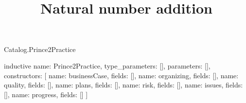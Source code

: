 \begin{lexlean}{Catalog.Prince2Practice}
\title{Natural number addition}
\begin{semanticmodule}
inductive{
  name: Prince2Practice,
  type_parameters: [],
  parameters: [],
  constructors: [
    {name: businessCase, fields: []},
    {name: organizing, fields: []},
    {name: quality, fields: []},
    {name: plans, fields: []},
    {name: risk, fields: []},
    {name: issues, fields: []},
    {name: progress, fields: []}
  ]
}
\end{semanticmodule}
\end{lexlean}
